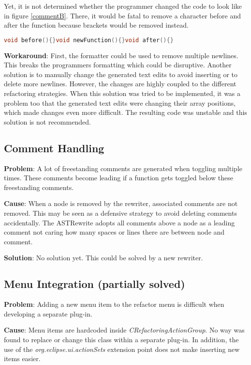 Yet, it is not determined whether the programmer changed the code to look like 
in figure \ref{commentB}. There, it would be fatal to remove a character before 
and after the function because brackets would be removed instead.

\begin{lstlisting}[caption={Code without the usual newlines},
label={commentB}, language=C++]
void before(){}void newFunction(){}void after(){}
\end{lstlisting}

\textbf{Workaround}: First, the formatter could be used to remove multiple 
newlines. This breaks the programmers formatting which could be disruptive. 
Another solution is to manually change the generated text edits to avoid 
inserting or to delete more newlines. However, the changes are highly coupled to 
the different refactoring strategies. When this solution was tried to be 
implemented, it was a problem too that the generated text edits were changing 
their array positions, which made changes even more difficult. The resulting 
code was unstable and this solution is not recommended. 

\subsection{Comment Handling}
\textbf{Problem}: A lot of freestanding comments are generated when
toggling multiple times. These comments become leading if a function gets
toggled below these freestanding comments.

\textbf{Cause}: When a node is removed by the rewriter, associated comments are 
not removed. This may be seen as a defensive strategy to avoid deleting comments 
accidentally. The ASTRewrite adopts all comments above a node as a leading
comment not caring how many spaces or lines there are between node and comment.

\textbf{Solution}: No solution yet. This could be solved by a new rewriter.

\subsection{Menu Integration (partially solved)}
\textbf{Problem}: Adding a new menu item to the refactor menu is difficult when 
developing a separate plug-in.

\textbf{Cause}: Menu items are hardcoded inside
\textit{CRefactoringActionGroup}. No way was found to replace or change this 
class within a separate plug-in. In addition, the use of the 
\textit{org.eclipse.ui.actionSets} extension point does not make inserting new 
items easier.

